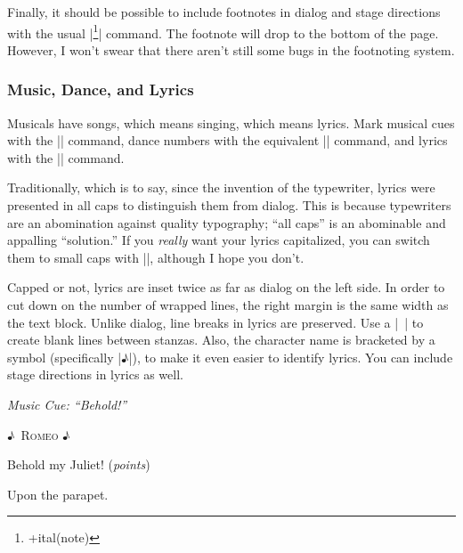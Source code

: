 \documentclass{article}
\let\ital\textit
\def\lyricsymbol{{\textsf ♪}}
\begin{document}
Finally, it should be possible to include footnotes in dialog and stage directions with the usual |\footnote{+ital(note)}| command. The footnote will drop to the bottom of the page. However, I won't swear that there aren't still some bugs in the footnoting system. 

\subsubsection{Music, Dance, and Lyrics}

Musicals have songs, which means singing, which means lyrics. Mark musical cues with the || command, dance numbers with the equivalent || command, and lyrics with the || command. 

Traditionally, which is to say, since the invention of the typewriter, lyrics were presented in all caps to distinguish them from dialog. This is because typewriters are an abomination against quality typography; “all caps” is an abominable and appalling “solution.” If you \ital{really} want your lyrics capitalized, you can switch them to small caps with |\toggletrue{scaplyrics}|, although I hope you don't.   

Capped or not, lyrics are inset twice as far as dialog on the left side. In order to cut down on the number of wrapped lines, the right margin is the same width as the text block. Unlike dialog, line breaks in lyrics are preserved. Use a |~| to create blank lines between stanzas. Also, the character name is bracketed by a symbol (specifically |\lyricsymbol|), to make it even easier to identify lyrics. You can include stage directions in lyrics as well.

\begin{example}
\end{example} 
\medskip

{\flushright\ital{Music Cue: “Behold!”}

}\centerline{\lyricsymbol~\textsc{Romeo} \lyricsymbol }

\hspace{4em}Behold my Juliet! (\ital{points})\strut

\hspace{4em}Upon the parapet.\strut
\end{document}
